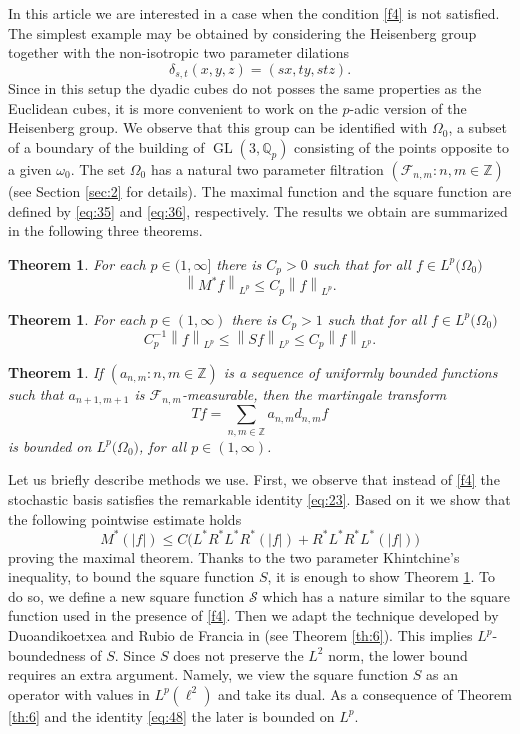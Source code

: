 \documentclass[a4paper]{amsart}
\newcommand{\norm}[1]{{\left\lVert #1 \right\rVert}}
\newcommand{\abs}[1]{{\lvert {#1} \rvert}}
\newcommand{\GL}{\operatorname{GL}}
\newcommand{\QQ}{\mathbb{Q}}
\newcommand{\ZZ}{\mathbb{Z}}
\newcommand{\calF}{\mathcal{F}}
\newcommand{\calS}{\mathcal{S}}
\theoremstyle{plain}
\theoremstyle{definition}
\theoremstyle{remark}
\numberwithin{equation}{section}
\newcounter{thm}
\theoremstyle{plain}
\newtheorem{main_theorem}[thm]{Theorem}
\begin{document}
In this article we are interested in a case when the condition \eqref{f4} is not satisfied. The simplest example 
may be obtained by considering the Heisenberg group together with the non-isotropic two parameter dilations
\[
	\delta_{s, t} (x, y, z) = (s x, t y, st z).
\]
Since in this setup the dyadic cubes do not posses the same properties as the Euclidean cubes, it is more convenient
to work on the $p$-adic version of the Heisenberg group. We observe that this group can be identified with $\Omega_0$,
a subset of a boundary of the building of $\GL(3, \QQ_p)$ consisting of the points opposite to a given $\omega_0$. The set
$\Omega_0$ has a natural two parameter filtration $(\calF_{n, m} : n, m \in \ZZ)$ (see Section \ref{sec:2} for
details). The maximal function and the square function are defined by \eqref{eq:35} and \eqref{eq:36}, respectively.
The results we obtain are summarized in the following three theorems.
\begin{main_theorem}
	\label{thm:1}
	For each $p \in (1, \infty]$ there is $C_p > 0$ such that for all $f \in L^p\big(\Omega_0\big)$
	\[
		\norm{M^*f}_{L^p} \leq C_p \norm{f}_{L^p}.
	\]
\end{main_theorem}
\begin{main_theorem}
	\label{thm:2}
	For each $p \in (1, \infty)$ there is $C_p > 1$ such that for all $f \in L^p\big(\Omega_0\big)$
	\[
		C_p^{-1} \norm{f}_{L^p} \leq \norm{S f}_{L^p} \leq C_p \norm{f}_{L^p}.
	\]
\end{main_theorem}
\begin{main_theorem}
	\label{thm:3}
	If $(a_{n, m} : n, m \in \ZZ)$ is a sequence of uniformly bounded functions such that $a_{n+1, m+1}$ is
	$\calF_{n, m}$-measurable, then the martingale transform
	\[
		T f = \sum_{n, m \in \ZZ} a_{n, m} d_{n, m} f 
	\]
	is bounded on $L^p\big(\Omega_0\big)$, for all $p \in (1, \infty)$.
\end{main_theorem}
Let us briefly describe methods we use. First, we observe that instead of \eqref{f4} the stochastic basis
satisfies the remarkable identity \eqref{eq:23}. Based on it we show that the following pointwise estimate holds
\begin{equation}
	\label{eq:37}
	M^*(\abs{f}) \leq C \big(L^* R^* L^* R^*(\abs{f}) + R^* L^* R^* L^* (\abs{f}) \big)
\end{equation}
proving the maximal theorem. Thanks to the two parameter Khintchine's inequality, to bound 
the square function $S$, it is enough to show Theorem \ref{thm:3}. To do so, we define a new square function $\calS$
which has a nature similar to the square function used in the presence of \eqref{f4}. Then we adapt the technique
developed by Duoandikoetxea and Rubio de Francia in \cite{DuoRdF} (see Theorem \ref{th:6}). This implies
$L^p$-boundedness of $S$. Since $S$ does not preserve the $L^2$ norm, the lower bound requires an extra argument.
Namely, we view the square function $S$ as an operator with values in $L^p(\ell^2)$ and take its dual. As a consequence
of Theorem \ref{th:6} and the identity \eqref{eq:48} the later is bounded on $L^p$. 
\end{document}
